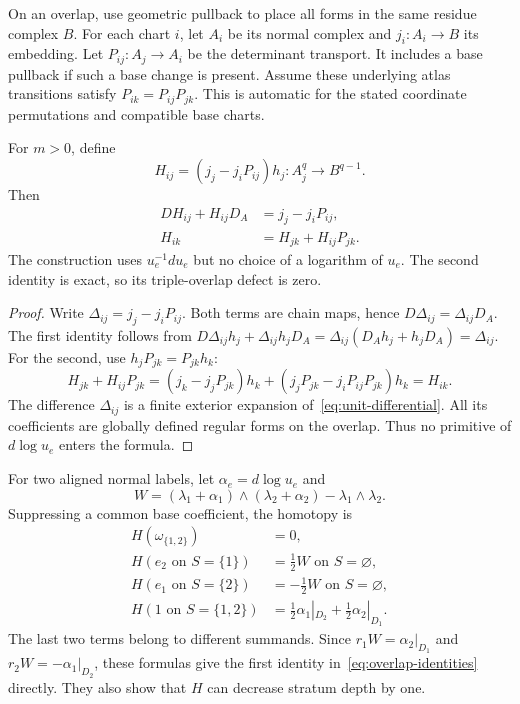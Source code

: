 On an overlap, use geometric pullback to place all forms in the same residue complex $B$.
For each chart $i$, let $A_i$ be its normal complex and $j_i:A_i\to B$ its embedding.
Let $P_{ij}:A_j\to A_i$ be the determinant transport.
It includes a base pullback if such a base change is present.
Assume these underlying atlas transitions satisfy $P_{ik}=P_{ij}P_{jk}$.
This is automatic for the stated coordinate permutations and compatible base charts.

\begin{theorem}
\label{thm:strict-homotopy-cocycle}
For $m>0$, define
\begin{equation}
\label{eq:overlap-homotopy}
H_{ij}=(j_j-j_iP_{ij})h_j:A_j^q\longrightarrow B^{q-1}.
\end{equation}
Then
\begin{align}
\label{eq:overlap-identities}
DH_{ij}+H_{ij}D_A&=j_j-j_iP_{ij},\\
H_{ik}&=H_{jk}+H_{ij}P_{jk}.
\end{align}
The construction uses $u_e^{-1}du_e$ but no choice of a logarithm of $u_e$.
The second identity is exact, so its triple-overlap defect is zero.
\end{theorem}

\begin{proof}
Write $\Delta_{ij}=j_j-j_iP_{ij}$.
Both terms are chain maps, hence $D\Delta_{ij}=\Delta_{ij}D_A$.
The first identity follows from
$D\Delta_{ij}h_j+\Delta_{ij}h_jD_A
=\Delta_{ij}(D_Ah_j+h_jD_A)=\Delta_{ij}$.
For the second, use $h_jP_{jk}=P_{jk}h_k$:
\[
H_{jk}+H_{ij}P_{jk}
=(j_k-j_jP_{jk})h_k
+(j_jP_{jk}-j_iP_{ij}P_{jk})h_k
=H_{ik}.
\]
The difference $\Delta_{ij}$ is a finite exterior expansion of~\eqref{eq:unit-differential}.
All its coefficients are globally defined regular forms on the overlap.
Thus no primitive of $d\log u_e$ enters the formula.
\end{proof}

For two aligned normal labels, let $\alpha_e=d\log u_e$ and
\[
W=(\lambda_1+\alpha_1)\wedge(\lambda_2+\alpha_2)
-\lambda_1\wedge\lambda_2.
\]
Suppressing a common base coefficient, the homotopy is
\begin{align*}
H(\omega_{\{1,2\}})&=0,\\
H(e_2\text{ on }S=\{1\})&=\tfrac12W\text{ on }S=\varnothing,\\
H(e_1\text{ on }S=\{2\})&=-\tfrac12W\text{ on }S=\varnothing,\\
H(1\text{ on }S=\{1,2\})
&=\tfrac12\alpha_1|_{D_2}+\tfrac12\alpha_2|_{D_1}.
\end{align*}
The last two terms belong to different summands.
Since $r_1W=\alpha_2|_{D_1}$ and $r_2W=-\alpha_1|_{D_2}$,
these formulas give the first identity in~\eqref{eq:overlap-identities} directly.
They also show that $H$ can decrease stratum depth by one.

